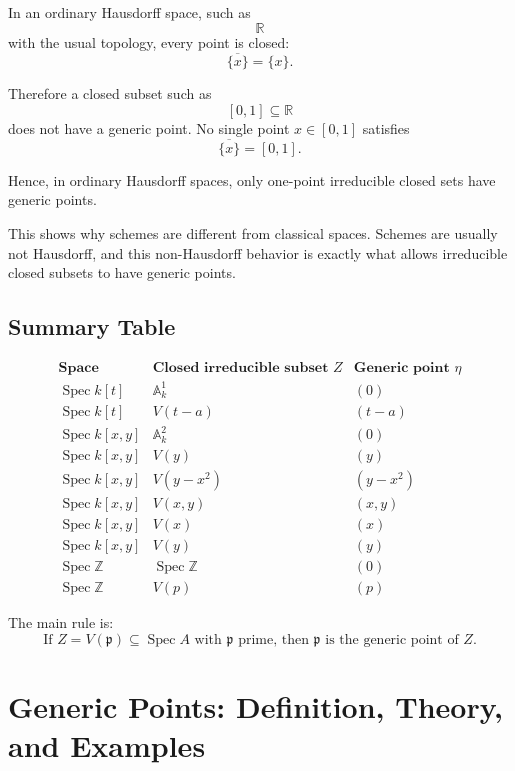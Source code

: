 \documentclass[12pt,a4paper]{article}
\theoremstyle{notespace}
\begin{document}
In an ordinary Hausdorff space, such as
\[
\mathbb R
\]
with the usual topology, every point is closed:
\[
\overline{\{x\}}=\{x\}.
\]

Therefore a closed subset such as
\[
[0,1]\subseteq \mathbb R
\]
does not have a generic point. No single point \(x\in [0,1]\) satisfies
\[
\overline{\{x\}}=[0,1].
\]

Hence, in ordinary Hausdorff spaces, only one-point irreducible closed sets have generic points.

This shows why schemes are different from classical spaces. Schemes are usually not Hausdorff, and this non-Hausdorff behavior is exactly what allows irreducible closed subsets to have generic points.

\subsection{Summary Table}

\[
\begin{array}{c|c|c}
	\textbf{Space}
	&
	\textbf{Closed irreducible subset }Z
	&
	\textbf{Generic point }\eta
	\\
	\hline
	\operatorname{Spec} k[t]
	&
	\mathbb A^1_k
	&
	(0)
	\\
	\operatorname{Spec} k[t]
	&
	V(t-a)
	&
	(t-a)
	\\
	\operatorname{Spec} k[x,y]
	&
	\mathbb A^2_k
	&
	(0)
	\\
	\operatorname{Spec} k[x,y]
	&
	V(y)
	&
	(y)
	\\
	\operatorname{Spec} k[x,y]
	&
	V(y-x^2)
	&
	(y-x^2)
	\\
	\operatorname{Spec} k[x,y]
	&
	V(x,y)
	&
	(x,y)
	\\
	\operatorname{Spec} k[x,y]
	&
	V(x)
	&
	(x)
	\\
	\operatorname{Spec} k[x,y]
	&
	V(y)
	&
	(y)
	\\
	\operatorname{Spec}\mathbb Z
	&
	\operatorname{Spec}\mathbb Z
	&
	(0)
	\\
	\operatorname{Spec}\mathbb Z
	&
	V(p)
	&
	(p)
\end{array}
\]

The main rule is:
\[
\boxed{
	\text{If }Z=V(\mathfrak p)\subseteq \operatorname{Spec} A
	\text{ with }\mathfrak p\text{ prime, then }\mathfrak p
	\text{ is the generic point of }Z.
}
\]

\section{Generic Points: Definition, Theory, and Examples}
\end{document}
